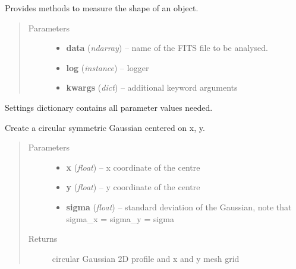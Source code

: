 \documentclass[a4paper,12pt,english]{sphinxmanual}
\begin{document}
\begin{fulllineitems}
\label{analysis:analysis.shape.shapeMeasurement}
Provides methods to measure the shape of an object.
\begin{quote}\begin{description}
\item[{Parameters}] \leavevmode\begin{itemize}
\item {} 
\textbf{data} (\emph{ndarray}) -- name of the FITS file to be analysed.

\item {} 
\textbf{log} (\emph{instance}) -- logger

\item {} 
\textbf{kwargs} (\emph{dict}) -- additional keyword arguments

\end{itemize}

\end{description}\end{quote}

Settings dictionary contains all parameter values needed.

\begin{fulllineitems}
\label{analysis:analysis.shape.shapeMeasurement.circular2DGaussian}
Create a circular symmetric Gaussian centered on x, y.
\begin{quote}\begin{description}
\item[{Parameters}] \leavevmode\begin{itemize}
\item {} 
\textbf{x} (\emph{float}) -- x coordinate of the centre

\item {} 
\textbf{y} (\emph{float}) -- y coordinate of the centre

\item {} 
\textbf{sigma} (\emph{float}) -- standard deviation of the Gaussian, note that sigma\_x = sigma\_y = sigma

\end{itemize}

\item[{Returns}] \leavevmode
circular Gaussian 2D profile and x and y mesh grid


\end{description}
\end{quote}
\end{fulllineitems}
\end{fulllineitems}
\end{document}
